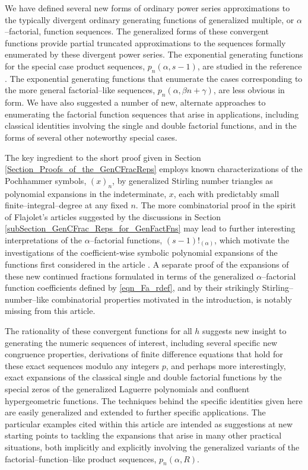\documentclass[12pt,reqno]{article}
\numberwithin{sfootnote}{section}
\numberwithin{equation}{section}
\theoremstyle{DefaultTheoremStyle}
\theoremstyle{definition}
\newcommand{\Pochhammer}[2]{\ensuremath{\left(#1\right)_{#2}}}
\begin{document}
We have defined several new forms of 
ordinary power series approximations to the 
typically divergent ordinary generating functions of 
generalized multiple, or $\alpha$--factorial, function sequences. 
The generalized forms of these convergent functions 
provide partial truncated approximations to the sequences formally 
enumerated by these divergent power series. 
The exponential generating functions for the 
special case product sequences, $p_n(\alpha, s-1)$, 
are studied in the reference \citep[\S 5]{MULTIFACTJIS}. 
The exponential generating functions that enumerate the 
cases corresponding to the more general factorial--like sequences, 
$p_n(\alpha, \beta n + \gamma)$, are less obvious in form. 
We have also suggested a number of new, alternate 
approaches to enumerating the factorial function sequences that arise 
in applications, including 
classical identities involving the single and double factorial functions, and 
in the forms of several other noteworthy special cases. 

The key ingredient to the short proof given in 
Section \ref{Section_Proofs_of_the_GenCFracReps} 
employs known characterizations of the 
Pochhammer symbols, $\Pochhammer{x}{n}$, by 
generalized Stirling number triangles as 
polynomial expansions in the indeterminate, $x$, 
each with predictably small finite--integral--degree at any fixed $n$. 
The more combinatorial proof in the spirit of Flajolet's articles 
suggested by the discussions in 
Section \ref{subSection_GenCFrac_Reps_for_GenFactFns} 
may lead to further interesting interpretations of the 
$\alpha$--factorial functions, $(s-1)!_{(\alpha)}$, 
which motivate the investigations of the coefficient-wise 
symbolic polynomial expansions of the functions first considered in the 
article \citep{MULTIFACTJIS}. 
A separate proof of the expansions of these new continued fractions 
formulated in terms of the 
generalized $\alpha$--factorial function coefficients defined by 
\eqref{eqn_Fa_rdef}, and by their strikingly Stirling--number--like 
combinatorial properties motivated in the introduction, 
is notably missing from this article. 

The rationality of these convergent functions for all $h$ 
suggests new insight to generating the numeric sequences of interest, 
including several specific new congruence properties, derivations of 
finite difference equations that hold for these exact sequences 
modulo any integers $p$, and perhaps more interestingly, 
exact expansions of the classical single and double factorial functions 
by the special zeros of the generalized Laguerre polynomials and 
confluent hypergeometric functions. 
The techniques behind the specific identities given here 
are easily generalized and extended to further specific applications. 
The particular examples cited within this article 
are intended as suggestions at new 
starting points to tackling the expansions that arise in 
many other practical situations, both implicitly and explicitly 
involving the generalized variants of the factorial--function--like 
product sequences, $p_n(\alpha, R)$. 
\end{document}
